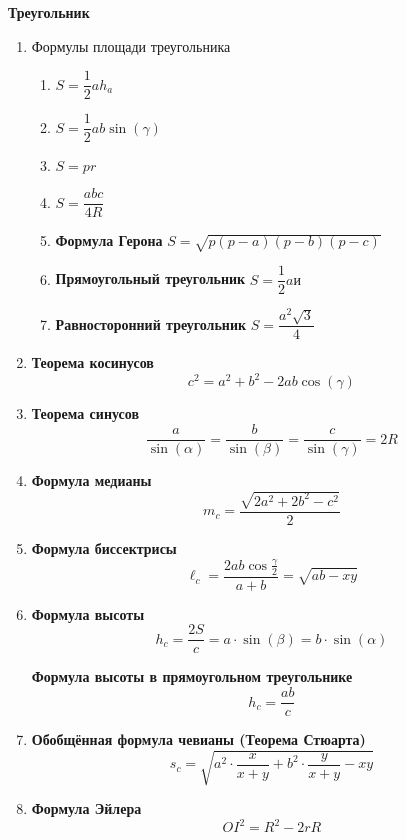 \documentclass{article}
\begin{document}
\large



\begin{center}
\textbf{Треугольник}
\end{center}

\begin{enumerate}[label*=\protect\fbox{\arabic{enumi}}]

\item Формулы площади треугольника
\begin{enumerate} 
	\item $S = \dfrac{1}{2}ah_a$
	\item $S = \dfrac{1}{2}ab \sin(\gamma)$
	\item $S = pr$
	\item $S = \dfrac{abc}{4R}$
	\item \textbf{Формула Герона} $S = \sqrt{p(p-a)(p-b)(p-c)}$
	\item \textbf{Прямоугольный треугольник} $S = \dfrac{1}{2}aи$
	\item \textbf{Равносторонний треугольник} $S = \dfrac{a^2\sqrt{3}}{4}$
\end{enumerate}

\item \textbf{Теорема косинусов}  $$c^2 = a^2 + b^2 - 2ab\cos(\gamma)$$

\item \textbf{Теорема синусов}  $$\frac{a}{\sin(\alpha)} = \frac{b}{\sin(\beta)} = \frac{c}{\sin(\gamma)} = 2R$$

\item \textbf{Формула медианы} $$m_c = \frac{\sqrt{2a^2 + 2b^2 - c^2}}{2}$$

\item \textbf{Формула биссектрисы} 
$$\ell_c = \frac{2ab\cos{\frac{\gamma}{2}}}{a + b} = \sqrt{ab - xy}$$ 

\item \textbf{Формула высоты} 
$$h_c = \frac{2S}{c} = a\cdot\sin(\beta) = b\cdot\sin(\alpha)$$ 

	\textbf{Формула высоты в прямоугольном треугольнике}
$$h_c = \frac{ab}{c}$$ 

\item \textbf{Обобщённая формула чевианы (Теорема Стюарта)}
$$s_c = \sqrt{a^2 \cdot \frac{x}{x + y} + b^2 \cdot \frac{y}{x + y} - xy}$$

\item \textbf{Формула Эйлера}
$$OI^2 = R^2 - 2rR$$


\end{enumerate}
\end{document}
